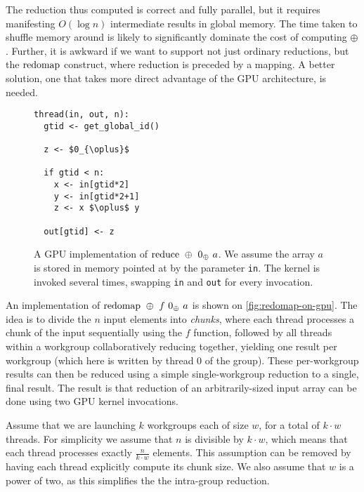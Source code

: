 The reduction thus computed is correct and fully parallel, but it
requires manifesting $O(\log n)$ intermediate results in global
memory.  The time taken to shuffle memory around is likely to
significantly dominate the cost of computing $\oplus$.  Further, it is
awkward if we want to support not just ordinary reductions, but the
$\mathrm{redomap}$ construct, where reduction is preceded by a mapping.  A
better solution, one that takes more direct advantage of the GPU
architecture, is needed.

\begin{figure}

\begin{lstlisting}[language={},mathescape]
thread(in, out, n):
  gtid <- get_global_id()

  z <- $0_{\oplus}$

  if gtid < n:
    x <- in[gtid*2]
    y <- in[gtid*2+1]
    z <- x $\oplus$ y

  out[gtid] <- z
\end{lstlisting}

  \caption{A GPU implementation of $\mathrm{reduce}~\oplus~0_{\oplus}~a$.  We
    assume the array $a$ is stored in memory pointed at by the
    parameter \texttt{in}.  The kernel is invoked several times,
    swapping \texttt{in} and \texttt{out} for every invocation.}
  \label{fig:reduce-on-gpu}
\end{figure}

An implementation of $\mathrm{redomap}~\oplus~f~0_{\oplus}~a$ is shown on
\cref{fig:redomap-on-gpu}.  The idea is to divide the $n$ input
elements into \textit{chunks}, where each thread processes a chunk of
the input sequentially using the $f$ function, followed by all threads
within a workgroup collaboratively reducing together, yielding one
result per workgroup (which here is written by thread 0 of the group).
These per-workgroup results can then be reduced using a simple
single-workgroup reduction to a single, final result.  The result is
that reduction of an arbitrarily-sized input array can be done using
two GPU kernel invocations.

Assume that we are launching $k$ workgroups each of size $w$, for a
total of $k\cdot{}w$ threads.  For simplicity we assume that $n$ is
divisible by $k\cdot{}w$, which means that each thread processes
exactly $\frac{n}{k\cdot{}w}$ elements.  This assumption can be
removed by having each thread explicitly compute its chunk size.  We
also assume that $w$ is a power of two, as this simplifies the the
intra-group reduction.

